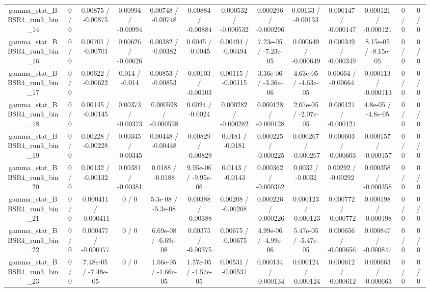 \documentclass[10pt]{article}
\begin{document}
\begin{table}[htbp]
\begin{center}
\begin{tabular}{|c|c|c|c|c|c|c|c|c|c|c|c|c|}
  gamma_stat_BBSR4_run3_bin_14 & 0 / 0 & 0.00875 / -0.00875 & 0.00994 / -0.00994 & 0.00748 / -0.00748 & 0.00884 / -0.00884 & 0.000532 / -0.000532 & 0.000296 / -0.000296 & 0.00133 / -0.00133 & 0.000147 / -0.000147 & 0.000121 / -0.000121 & 0 / 0 & 0 / 0 \\ 
  gamma_stat_BBSR4_run3_bin_16 & 0 / 0 & 0.00701 / -0.00701 & 0.00626 / -0.00626 & 0.00382 / -0.00382 & 0.0045 / -0.0045 & 0.00494 / -0.00494 & 7.23e-05 / -7.23e-05 & 0.000649 / -0.000649 & 0.000349 / -0.000349 & 8.15e-05 / -8.15e-05 & 0 / 0 & 0 / 0 \\ 
  gamma_stat_BBSR4_run3_bin_17 & 0 / 0 & 0.00622 / -0.00622 & 0.014 / -0.014 & 0.00853 / -0.00853 & 0.00103 / -0.00103 & 0.00115 / -0.00115 & 3.36e-06 / -3.36e-06 & 4.63e-05 / -4.63e-05 & 0.00664 / -0.00664 & 0.000113 / -0.000113 & 0 / 0 & 0 / 0 \\ 
  gamma_stat_BBSR4_run3_bin_18 & 0 / 0 & 0.00145 / -0.00145 & 0.00373 / -0.00373 & 0.000598 / -0.000598 & 0.0024 / -0.0024 & 0.000282 / -0.000282 & 0.000128 / -0.000128 & 2.07e-05 / -2.07e-05 & 0.000121 / -0.000121 & 4.8e-05 / -4.8e-05 & 0 / 0 & 0 / 0 \\ 
  gamma_stat_BBSR4_run3_bin_19 & 0 / 0 & 0.00228 / -0.00228 & 0.00345 / -0.00345 & 0.00448 / -0.00448 & 0.00829 / -0.00829 & 0.0181 / -0.0181 & 0.000225 / -0.000225 & 0.000267 / -0.000267 & 0.000603 / -0.000603 & 0.000157 / -0.000157 & 0 / 0 & 0 / 0 \\ 
  gamma_stat_BBSR4_run3_bin_20 & 0 / 0 & 0.00132 / -0.00132 & 0.00381 / -0.00381 & 0.0188 / -0.0188 & 9.95e-06 / -9.95e-06 & 0.0143 / -0.0143 & 0.000362 / -0.000362 & 0.0032 / -0.0032 & 0.00292 / -0.00292 & 0.000358 / -0.000358 & 0 / 0 & 0 / 0 \\ 
  gamma_stat_BBSR4_run3_bin_21 & 0 / 0 & 0.000411 / -0.000411 & 0 / 0 & 5.3e-08 / -5.3e-08 & 0.00388 / -0.00388 & 0.00208 / -0.00208 & 0.000226 / -0.000226 & 0.000123 / -0.000123 & 0.000772 / -0.000772 & 0.000198 / -0.000198 & 0 / 0 & 0 / 0 \\ 
  gamma_stat_BBSR4_run3_bin_22 & 0 / 0 & 0.000477 / -0.000477 & 0 / 0 & 6.69e-08 / -6.69e-08 & 0.00375 / -0.00375 & 0.00675 / -0.00675 & 4.99e-06 / -4.99e-06 & 5.47e-05 / -5.47e-05 & 0.000656 / -0.000656 & 0.000847 / -0.000847 & 0 / 0 & 0 / 0 \\ 
  gamma_stat_BBSR4_run3_bin_23 & 0 / 0 & 7.48e-05 / -7.48e-05 & 0 / 0 & 1.66e-05 / -1.66e-05 & 1.57e-05 / -1.57e-05 & 0.00531 / -0.00531 & 0.000134 / -0.000134 & 0.000124 / -0.000124 & 0.000612 / -0.000612 & 0.000663 / -0.000663 & 0 / 0 & 0 / 0 \\ 

\end{tabular}
\end{center}
\end{table}
\end{document}
